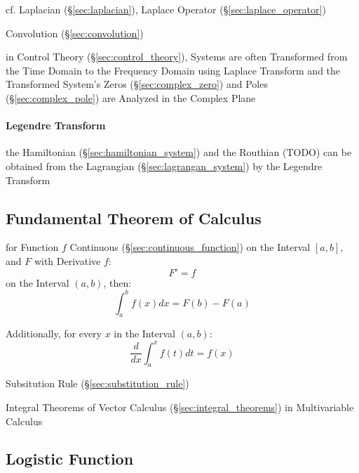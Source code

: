 \fist cf. Laplacian (\S\ref{sec:laplacian}), Laplace Operator
(\S\ref{sec:laplace_operator}) %

Convolution (\S\ref{sec:convolution})

in Control Theory (\S\ref{sec:control_theory}), Systems are often Transformed
from the Time Domain to the Frequency Domain using Laplace Transform and the
Transformed System's Zeros (\S\ref{sec:complex_zero}) and Poles
(\S\ref{sec:complex_pole}) are Analyzed in the Complex Plane



\paragraph{Legendre Transform}\label{sec:legendre_transform}\hfill

the Hamiltonian (\S\ref{sec:hamiltonian_system}) and the Routhian (TODO) can be
obtained from the Lagrangian (\S\ref{sec:lagrangan_system}) by the Legendre
Transform



\subsection{Fundamental Theorem of Calculus}
\label{sec:fundamental_calculus_theorem}

for Function $f$ Continuous (\S\ref{sec:continuous_function}) on the Interval
$[a,b]$, and $F$ with Derivative $f$:
\[
  F' = f
\]
on the Interval $(a,b)$, then:
\[
  \int_a^b f(x) dx = F(b) - F(a)
\]

Additionally, for every $x$ in the Interval $(a,b)$:
\[
  \frac{d}{dx}\int^x_a f(t) dt = f(x)
\]

\fist Subsitution Rule (\S\ref{sec:substitution_rule})

\fist Integral Theorems of Vector Calculus
(\S\ref{sec:integral_theorems}) in Multivariable Calculus



\subsection{Logistic Function}\label{sec:logistic_function}

